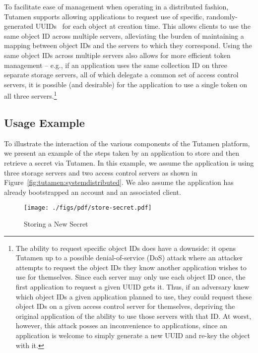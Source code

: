 To facilitate ease of management when operating in a distributed
fashion, Tutamen supports allowing applications to request use of
specific, randomly-generated UUIDs~\cite{leach2005} for each object at
creation time. This allows clients to use the same object ID across
multiple servers, alleviating the burden of maintaining a mapping
between object IDs and the servers to which they correspond. Using the
same object IDs across multiple servers also allows for more efficient
token management -- e.g., if an application uses the same collection
ID on three separate storage servers, all of which delegate a common
set of access control servers, it is possible (and desirable) for the
application to use a single token on all three servers.\footnote{The
  ability to request specific object IDs does have a downside: it
  opens Tutamen up to a possible denial-of-service (DoS) attack where
  an attacker attempts to request the object IDs they know another
  application wishes to use for themselves. Since each server may only
  use each object ID once, the first application to request a given
  UUID gets it. Thus, if an adversary knew which object IDs a given
  application planned to use, they could request these object IDs on a
  given access control server for themselves, depriving the original
  application of the ability to use those servers with that ID. At
  worst, however, this attack posses an inconvenience to applications,
  since an application is welcome to simply generate a new UUID and
  re-key the object with it.}

\subsection{Usage Example}

To illustrate the interaction of the various components of the Tutamen
platform, we present an example of the steps taken by an application
to store and then retrieve a secret via Tutamen. In this example, we
assume the application is using three storage servers and two access
control servers as shown in
Figure~\ref{fig:tutamen:systemdistributed}. We also assume the
application has already bootstrapped an account and an associated
client.

\begin{figure}[th]
  \centering
  \texttt{[image: ./figs/pdf/store-secret.pdf]}
  \caption{Storing a New Secret}
  \label{fig:tutamen:storesecret}
\end{figure}

